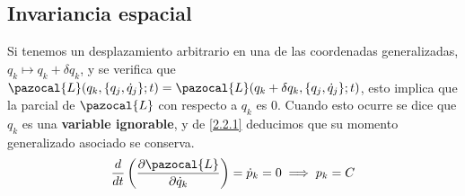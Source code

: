 \vspace{-25pt}
\subsection{Invariancia espacial}
Si tenemos un desplazamiento arbitrario en una de las coordenadas generalizadas, $q_k\mapsto q_k + \delta q_k$, y se verifica que $\pazocal{L}(q_k,\{q_j,\dot{q}_j\};t)=\pazocal{L}(q_k+\delta q_k,\{q_j,\dot{q}_j\};t)$, esto implica que la parcial de $\pazocal{L}$ con respecto a $q_k$ es 0. Cuando esto ocurre se dice que $q_k$ es una \textbf{variable ignorable}, y de \eqref{2.2.1} deducimos que su momento generalizado asociado se conserva.
\begin{equation} \label{3.1.4}
    \frac{d}{dt}\left(\frac{\partial \pazocal{L}}{\partial \dot{q}_k}\right) = \dot{p}_k = 0 \implies p_k = C
\end{equation} 
